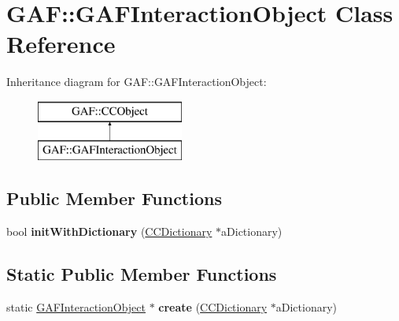 \hypertarget{class_g_a_f_1_1_g_a_f_interaction_object}{\section{G\-A\-F\-:\-:G\-A\-F\-Interaction\-Object Class Reference}
\label{class_g_a_f_1_1_g_a_f_interaction_object}
}
Inheritance diagram for G\-A\-F\-:\-:G\-A\-F\-Interaction\-Object\-:\begin{figure}[H]
\begin{center}
\leavevmode
\includegraphics[height=2.000000cm]{class_g_a_f_1_1_g_a_f_interaction_object}
\end{center}
\end{figure}
\subsection*{Public Member Functions}
\begin{DoxyCompactItemize}
\item 
\hypertarget{class_g_a_f_1_1_g_a_f_interaction_object_aac8829b9b8f3b689a647394939ef72b2}{bool {\bfseries init\-With\-Dictionary} (\hyperlink{class_g_a_f_1_1_c_c_dictionary}{C\-C\-Dictionary} $\ast$a\-Dictionary)}\label{class_g_a_f_1_1_g_a_f_interaction_object_aac8829b9b8f3b689a647394939ef72b2}

\end{DoxyCompactItemize}
\subsection*{Static Public Member Functions}
\begin{DoxyCompactItemize}
\item 
\hypertarget{class_g_a_f_1_1_g_a_f_interaction_object_afa332acfa3fb81961619605d6cfb2854}{static \hyperlink{class_g_a_f_1_1_g_a_f_interaction_object}{G\-A\-F\-Interaction\-Object} $\ast$ {\bfseries create} (\hyperlink{class_g_a_f_1_1_c_c_dictionary}{C\-C\-Dictionary} $\ast$a\-Dictionary)}\label{class_g_a_f_1_1_g_a_f_interaction_object_afa332acfa3fb81961619605d6cfb2854}

\end{DoxyCompactItemize}
